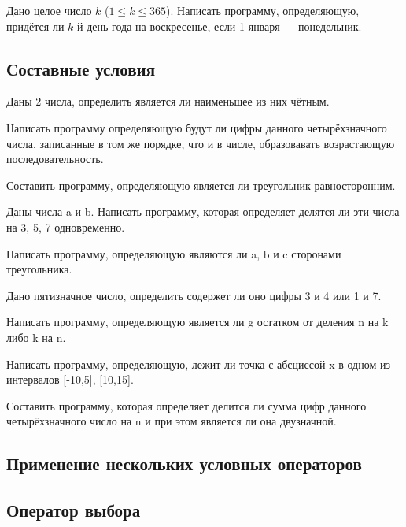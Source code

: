 \task Дано целое число $k$ ($1 \leqslant k \leqslant 365$). Написать
программу, определяющую, придётся ли $k$-й день года на воскресенье,
если 1 января — понедельник.

\subsection{Составные условия} 



\task Даны 2 числа, определить является ли наименьшее из них чётным.

\task Написать программу определяющую будут ли цифры данного
четырёхзначного числа, записанные в том же порядке, что и в числе,
образовавать возрастающую последовательность.

\task Составить программу, определяющую является ли треугольник
равносторонним.

\task Даны числа a и b. Написать программу, которая определяет делятся
ли эти числа на 3, 5, 7 одновременно.

\task Написать программу, определяющую являются ли a, b и c сторонами
треугольника.

\task Дано пятизначное число, определить содержет ли оно цифры 3 и 4
или 1 и 7.

\task Написать программу, определяющую является ли g остатком от
деления n на k либо k на n.

\task Написать программу, определяющую, лежит ли точка с абсциссой x в
одном из интервалов [-10,5], [10,15].

\task Составить программу, которая определяет делится ли сумма цифр
данного четырёхзначного число на n и при этом является ли она
двузначной.

\subsection{Применение нескольких условных операторов}





\subsection{Оператор выбора}


